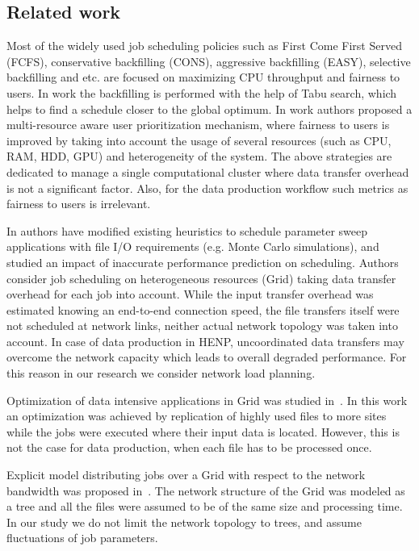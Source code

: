 \documentclass[english]{ddny}
\begin{document}
\subsection{Related work}
Most of the widely used job scheduling policies such as First Come First Served (FCFS), conservative backfilling (CONS), aggressive backfilling (EASY), selective backfilling and etc. \cite{srinivasan2002selective} are focused on maximizing CPU throughput and fairness to users. In work  \cite{Rudova_Tabu_search} the backfilling is performed with the help of Tabu search, which helps to find a schedule closer to the global optimum. In work \cite{Rudova_Multi-resource} authors proposed a multi-resource aware user prioritization mechanism, where fairness to users is improved by taking into account the usage of several resources (such as CPU, RAM, HDD, GPU) and heterogeneity of the system.  The above strategies are dedicated to manage a single computational cluster where data transfer overhead is not a significant factor. Also, for the data production workflow such metrics as fairness to users is irrelevant.
 

In \cite{casanova2000heuristics} authors have modified existing heuristics  to schedule parameter sweep applications with file I/O requirements (e.g. Monte Carlo simulations), and studied an impact of inaccurate performance prediction on scheduling. Authors consider job scheduling on heterogeneous resources (Grid) taking data transfer overhead for each job into account. While the input transfer overhead was estimated knowing an end-to-end connection speed, the file transfers itself were not scheduled at network links, neither actual network topology was taken into account. In case of data production in HENP, uncoordinated data transfers may overcome the network capacity which leads to overall degraded performance. For this reason in our research we consider network load planning.

Optimization of data intensive applications in Grid was studied
in~\cite{Globus_scheduler}. In this work an optimization was achieved by
replication of highly used files to more sites while the jobs were executed
where their input data is located. However, this is not the case for data
production, when each file has to be processed once. 

Explicit model distributing jobs over a Grid with respect to the network
bandwidth was proposed in~\cite{Trees}. The network structure of the Grid was
modeled as a tree and all the files were assumed to be of the same size and
processing time. In our study we do not limit the network topology to trees,
and assume fluctuations of job parameters. 
\end{document}
